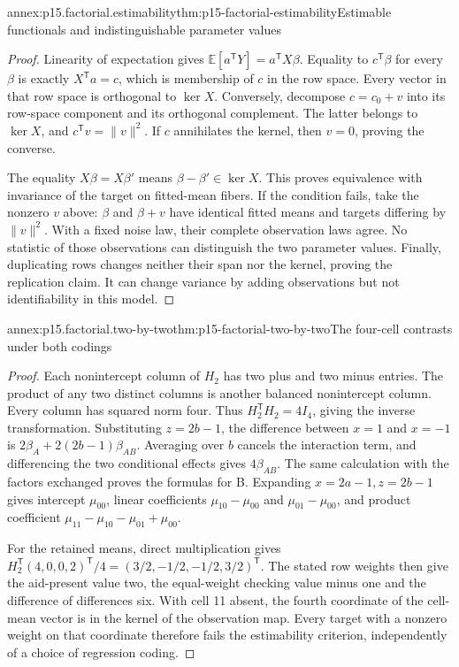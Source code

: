 
\begin{annexitem}{annex:p15.factorial.estimability}{thm:p15-factorial-estimability}{Estimable functionals and indistinguishable parameter values}
\begin{proof}
Linearity of expectation gives
\(\mathbb E[a^{\mathsf T}Y]=a^{\mathsf T}X\beta\).
Equality to \(c^{\mathsf T}\beta\) for every \(\beta\) is exactly
\(X^{\mathsf T}a=c\), which is membership of \(c\) in the row space.
Every vector in that row space is orthogonal to \(\ker X\).
Conversely, decompose \(c=c_0+v\) into its row-space component and its
orthogonal complement. The latter belongs to \(\ker X\), and
\(c^{\mathsf T}v=\|v\|^2\). If \(c\) annihilates the kernel, then
\(v=0\), proving the converse.

The equality \(X\beta=X\beta'\) means
\(\beta-\beta'\in\ker X\). This proves equivalence with invariance
of the target on fitted-mean fibers. If the condition fails, take the
nonzero \(v\) above: \(\beta\) and \(\beta+v\) have identical
fitted means and targets differing by \(\|v\|^2\). With a fixed noise
law, their complete observation laws agree. No statistic of those
observations can distinguish the two parameter values. Finally, duplicating
rows changes neither their span nor the kernel, proving the replication
claim. It can change variance by adding observations but not identifiability
in this model.
\end{proof}
\end{annexitem}

\begin{annexitem}{annex:p15.factorial.two-by-two}{thm:p15-factorial-two-by-two}{The four-cell contrasts under both codings}
\begin{proof}
Each nonintercept column of \(H_2\) has two plus and two minus entries.
The product of any two distinct columns is another balanced nonintercept
column. Every column has squared norm four. Thus
\(H_2^{\mathsf T}H_2=4I_4\), giving the inverse transformation.
Substituting \(z=2b-1\), the difference between \(x=1\) and \(x=-1\)
is \(2\beta_A+2(2b-1)\beta_{AB}\). Averaging over \(b\) cancels
the interaction term, and differencing the two conditional effects gives
\(4\beta_{AB}\). The same calculation with the factors exchanged proves
the formulas for B. Expanding \(x=2a-1,z=2b-1\) gives intercept
\(\mu_{00}\), linear coefficients
\(\mu_{10}-\mu_{00}\) and \(\mu_{01}-\mu_{00}\), and product
coefficient \(\mu_{11}-\mu_{10}-\mu_{01}+\mu_{00}\).

For the retained means, direct multiplication gives
\(H_2^{\mathsf T}(4,0,0,2)^{\mathsf T}/4
=(3/2,-1/2,-1/2,3/2)^{\mathsf T}\). The stated row weights then give
the aid-present value two, the equal-weight checking value minus one and
the difference of differences six. With cell 11 absent, the fourth
coordinate of the cell-mean vector is in the kernel of the observation
map. Every target with a nonzero weight on that coordinate therefore fails
the estimability criterion, independently of a choice of regression coding.
\end{proof}
\end{annexitem}

